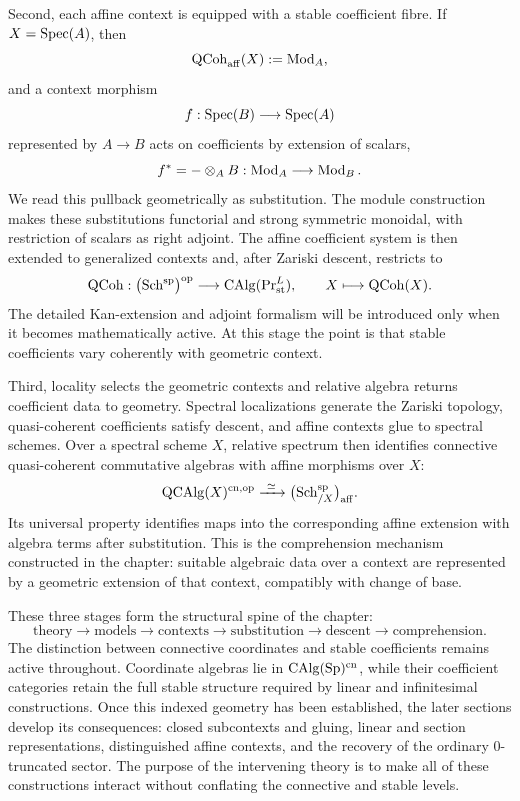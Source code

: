 Second, each affine context is equipped with a stable coefficient fibre. If
\(X=\operatorname{Spec}(A)\), then
\[
    \operatorname{QCoh}_{\mathrm{aff}}(X)
    :=
    \operatorname{Mod}_A,
\]
and a context morphism
\[
    f:\operatorname{Spec}(B)\longrightarrow\operatorname{Spec}(A)
\]
represented by \(A\to B\) acts on coefficients by extension of scalars,
\[
    f^*
    =
    -\otimes_AB
    :
    \operatorname{Mod}_A
    \longrightarrow
    \operatorname{Mod}_B.
\]
We read this pullback geometrically as substitution. The module construction
makes these substitutions functorial and strong symmetric monoidal, with
restriction of scalars as right adjoint. The affine coefficient system is then
extended to generalized contexts and, after Zariski descent, restricts to
\[
    \operatorname{QCoh}
    :
    \bigl(\operatorname{Sch}^{\mathrm{sp}}\bigr)^{\mathrm{op}}
    \longrightarrow
    \operatorname{CAlg}(\operatorname{Pr}^L_{\mathrm{st}}),
    \qquad
    X\longmapsto\operatorname{QCoh}(X).
\]
The detailed Kan-extension and adjoint formalism will be introduced only when
it becomes mathematically active. At this stage the point is that stable
coefficients vary coherently with geometric context.

Third, locality selects the geometric contexts and relative algebra returns
coefficient data to geometry. Spectral localizations generate the Zariski
topology, quasi-coherent coefficients satisfy descent, and affine contexts
glue to spectral schemes. Over a spectral scheme \(X\), relative spectrum
then identifies connective quasi-coherent commutative algebras with affine
morphisms over \(X\):
\[
    \operatorname{QCAlg}(X)^{\mathrm{cn},\mathrm{op}}
    \xrightarrow{\ \simeq\ }
    \bigl(\operatorname{Sch}^{\mathrm{sp}}_{/X}\bigr)_{\mathrm{aff}}.
\]
Its universal property identifies maps into the corresponding affine extension
with algebra terms after substitution. This is the comprehension mechanism
constructed in the chapter: suitable algebraic data over a context are
represented by a geometric extension of that context, compatibly with change
of base.

These three stages form the structural spine of the chapter:
\[
    \boxed{
    \text{theory}
    \to
    \text{models}
    \to
    \text{contexts}
    \to
    \text{substitution}
    \to
    \text{descent}
    \to
    \text{comprehension}.}
\]
The distinction between connective coordinates and stable coefficients remains
active throughout. Coordinate algebras lie in
\(\operatorname{CAlg}(\operatorname{Sp})^{\mathrm{cn}}\), while their coefficient categories retain the
full stable structure required by linear and infinitesimal constructions.
Once this indexed geometry has been established, the later sections develop
its consequences: closed subcontexts and gluing, linear and section
representations, distinguished affine contexts, and the recovery of the
ordinary \(0\)-truncated sector. The purpose of the intervening theory is to
make all of these constructions interact without conflating the connective
and stable levels.

